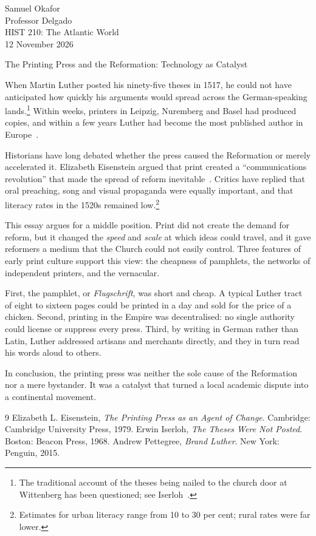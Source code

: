 \documentclass[12pt]{article}
\begin{document}
\begin{flushleft}
Samuel Okafor\\
Professor Delgado\\
HIST 210: The Atlantic World\\
12 November 2026
\end{flushleft}

\begin{center}
The Printing Press and the Reformation: Technology as Catalyst
\end{center}

When Martin Luther posted his ninety-five theses in 1517, he could not have anticipated
how quickly his arguments would spread across the German-speaking lands.\footnote{The
traditional account of the theses being nailed to the church door at Wittenberg has been
questioned; see Iserloh~\cite{iserloh}.} Within weeks, printers in Leipzig, Nuremberg and
Basel had produced copies, and within a few years Luther had become the most published
author in Europe~\cite{pettegree}.

Historians have long debated whether the press caused the Reformation or merely
accelerated it. Elizabeth Eisenstein argued that print created a ``communications
revolution'' that made the spread of reform inevitable~\cite{eisenstein}. Critics have
replied that oral preaching, song and visual propaganda were equally important, and that
literacy rates in the 1520s remained low.\footnote{Estimates for urban literacy range
from 10 to 30 per cent; rural rates were far lower.}

This essay argues for a middle position. Print did not create the demand for reform, but
it changed the \emph{speed} and \emph{scale} at which ideas could travel, and it gave
reformers a medium that the Church could not easily control. Three features of early
print culture support this view: the cheapness of pamphlets, the networks of
independent printers, and the vernacular.

First, the pamphlet, or \emph{Flugschrift}, was short and cheap. A typical Luther tract
of eight to sixteen pages could be printed in a day and sold for the price of a chicken.
Second, printing in the Empire was decentralised: no single authority could license or
suppress every press. Third, by writing in German rather than Latin, Luther addressed
artisans and merchants directly, and they in turn read his words aloud to others.

In conclusion, the printing press was neither the sole cause of the Reformation nor a
mere bystander. It was a catalyst that turned a local academic dispute into a
continental movement.

\begin{thebibliography}{9}
 Elizabeth L. Eisenstein, \emph{The Printing Press as an Agent of
Change}. Cambridge: Cambridge University Press, 1979.
 Erwin Iserloh, \emph{The Theses Were Not Posted}. Boston: Beacon
Press, 1968.
 Andrew Pettegree, \emph{Brand Luther}. New York: Penguin, 2015.
\end{thebibliography}
\end{document}
